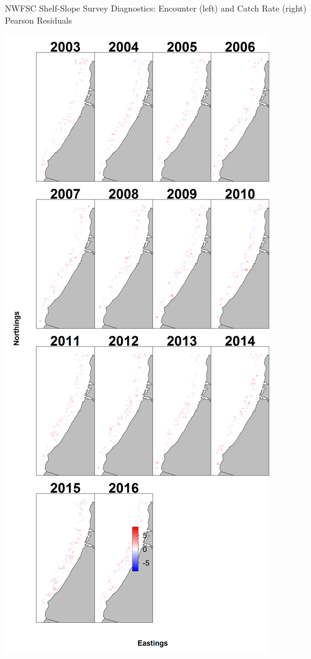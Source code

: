 \documentclass[pdf]{beamer}\usepackage[]{graphicx}\usepackage[]{color}
\begin{document}
\begin{frame}{NWFSC Shelf-Slope Survey Diagnostics: Encounter (left) and Catch Rate (right) Pearson Residuals}
  \begin{center}
  \includegraphics[scale = 0.12]{figures/Combo_maps--encounter_pearson_resid.png}

\end{center}
\end{frame}
\end{document}
